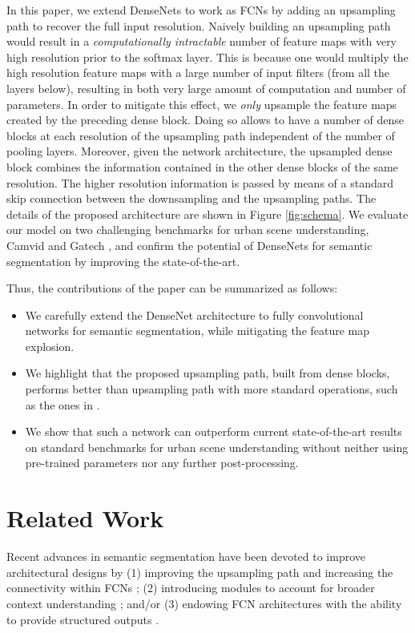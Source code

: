 \documentclass[10pt,twocolumn,letterpaper]{article}
\begin{document}
In this paper, we extend DenseNets to work as FCNs by adding an upsampling path to recover the full input resolution. Naively building an upsampling path would result in a \emph{computationally intractable} number of feature maps with very high resolution prior to the softmax layer. This is because one would multiply the high resolution feature maps with a large number of input filters (from all the layers below), resulting in both very large amount of computation and number of parameters. In order to mitigate this effect, we \emph{only} upsample the feature maps created by the preceding dense block. Doing so allows to have a number of dense blocks at each resolution of the upsampling path independent of the number of pooling layers. Moreover, given the network architecture, the upsampled dense block combines the information contained in the other dense blocks of the same resolution. The higher resolution information is passed by means of a standard skip connection between the downsampling and the upsampling paths. The details of the proposed architecture are shown in Figure \ref{fig:schema}. We evaluate our model on two challenging benchmarks for urban scene understanding, Camvid \cite{camvid} and Gatech \cite{Gatech}, and confirm the potential of DenseNets for semantic segmentation by improving the state-of-the-art. 

Thus, the contributions of the paper can be summarized as follows: 
\begin{itemize}
\item We carefully extend the DenseNet architecture \cite{DenseNet2016} to fully convolutional networks for semantic segmentation, while mitigating the feature map explosion.
\item We highlight that the proposed upsampling path, built from dense blocks, performs better than upsampling path with more standard operations, such as the ones in \cite{ronneberger2015u}.
\item We show that such a network can outperform current state-of-the-art results on standard benchmarks for urban scene understanding without neither using pre-trained parameters nor any further post-processing.
\end{itemize}


\section{Related Work}
\label{sec:related_work} 

Recent advances in semantic segmentation have been devoted to improve architectural designs by (1) improving the upsampling path and increasing the connectivity within FCNs \cite{ronneberger2015u, SegNet2015, noh2015learning, DrozdzalVCKP16}; (2) introducing modules to account for broader context understanding \cite{VisinKCBMC15, chen14semantic, YuKoltun2016}; and/or (3) endowing FCN architectures with the ability to provide structured outputs \cite{Koltun11, chen14semantic, CRFasRNN}. 
\end{document}
